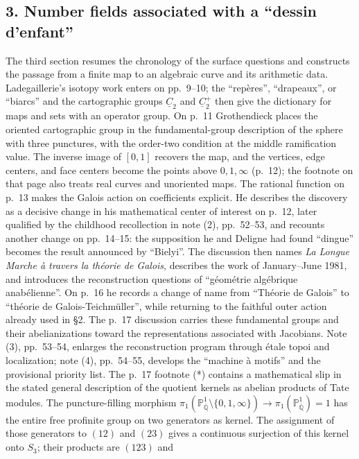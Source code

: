 \documentclass[11pt,a4paper]{article}
\begin{document}
\subsection*{3. Number fields associated with a ``dessin d'enfant''}
The third section resumes the chronology of the surface questions and
constructs the passage from a finite map to an algebraic curve and its
arithmetic data. Ladegaillerie's isotopy work enters on pp.~9--10; the
``repères'', ``drapeaux'', or ``biarcs'' and the cartographic groups
$\underline C_2$ and $\underline C_2^+$ then give the dictionary for maps
and sets with an operator group. On p.~11 Grothendieck places the oriented
cartographic group in the fundamental-group description of the sphere
with three punctures, with the order-two condition at the middle
ramification value. The inverse image of $[0,1]$ recovers the map, and
the vertices, edge centers, and face centers become the points above
$0,1,\infty$ (p.~12); the footnote on that page also treats real curves
and unoriented maps. The rational function on p.~13 makes the Galois
action on coefficients explicit. He describes the discovery as a decisive
change in his mathematical center of interest on p.~12, later qualified
by the childhood recollection in note (2), pp.~52--53, and recounts
another change on pp.~14--15: the supposition he and Deligne had found
``dingue'' becomes the result announced by ``Bielyi''. The discussion then
names \emph{La Longue Marche à travers la théorie de Galois}, describes
the work of January--June 1981, and introduces the reconstruction questions
of ``géométrie algébrique anabélienne''. On p.~16 he records a change of
name from ``Théorie de Galois'' to ``théorie de Galois-Teichmüller'', while
returning to the faithful outer action already used in \S2. The p.~17
discussion carries these fundamental groups and their abelianizations
toward the representations associated with Jacobians. Note (3),
pp.~53--54, enlarges the reconstruction program through étale topoi
and localization; note (4), pp.~54--55, develops the ``machine à motifs''
and the provisional priority list. The p.~17 footnote (*)
contains a mathematical slip in the stated general description of the
quotient kernels as abelian products of Tate modules. The puncture-filling
morphism
$\pi_1(\mathbb P^1_{\overline{\mathbb Q}}\setminus\{0,1,\infty\})
\longrightarrow\pi_1(\mathbb P^1_{\overline{\mathbb Q}})=1$
has the entire free profinite group on two generators as kernel. The
assignment of those generators to $(12)$ and $(23)$ gives a continuous
surjection of this kernel onto $S_3$; their products are $(123)$ and
\end{document}
